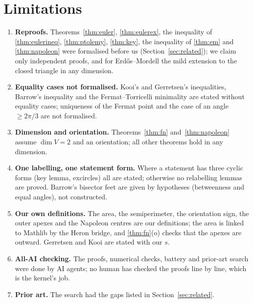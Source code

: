 \documentclass[11pt]{article}
\theoremstyle{definition}
\theoremstyle{remark}
\begin{document}
\section{Limitations}\label{sec:limits}
\begin{enumerate}
\item \textbf{Reproofs.} Theorems~\ref{thm:euler}, \ref{thm:eulerex}, the inequality of
\ref{thm:eulerineq}, \ref{thm:ptolemy}, \ref{thm:key}, the inequality of \ref{thm:em} and
\ref{thm:napoleon} were formalised before us (Section~\ref{sec:related}); we claim only independent
proofs, and for Erdős--Mordell the mild extension to the closed triangle in any dimension.
\item \textbf{Equality cases not formalised.} Kooi's and Gerretsen's inequalities, Barrow's
inequality and the Fermat--Torricelli minimality are stated without equality cases; uniqueness of the
Fermat point and the case of an angle $\ge2\pi/3$ are not formalised.
\item \textbf{Dimension and orientation.} Theorems~\ref{thm:fn} and~\ref{thm:napoleon} assume
$\dim V=2$ and an orientation; all other theorems hold in any dimension.
\item \textbf{One labelling, one statement form.} Where a statement has three cyclic forms (key lemma,
excircles) all are stated; otherwise no relabelling lemmas are proved. Barrow's bisector feet are
given by hypotheses (betweenness and equal angles), not constructed.
\item \textbf{Our own definitions.} The area, the semiperimeter, the orientation sign, the outer apexes
and the Napoleon centres are our definitions; the area is linked to Mathlib by the Heron bridge, and
\ref{thm:fn}(o) checks that the apexes are outward. Gerretsen and Kooi are stated with our $s$.
\item \textbf{All-AI checking.} The proofs, numerical checks, battery and prior-art search were done by
AI agents; no human has checked the proofs line by line, which is the kernel's job.
\item \textbf{Prior art.} The search had the gaps listed in Section~\ref{sec:related}.
\end{enumerate}
\end{document}
